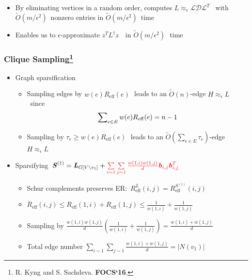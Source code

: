 \documentclass[12pt]{beamer}
\def\sizeof#1{\left|#1  \right|}
\def\eps{\epsilon}
\newcommand\ttau{\boldsymbol{\mathit{\tau}}}
\newcommand\er{R_{\mathrm{eff}}}
\newcommand\bb{\boldsymbol{\mathit{b}}}
\newcommand\zz{\boldsymbol{\mathit{z}}}
\newcommand\LL{\boldsymbol{\mathit{L}}}
\newcommand\LH{\boldsymbol{\mathit{H}}}
\renewcommand\SS{\boldsymbol{\mathit{S}}}
\newcommand{\calD}{\boldsymbol{\mathit{\mathcal{D}}}}
\newcommand{\matlow}{\boldsymbol{\mathit{{\mathcal{L}}}}}
\newcommand{\kh}[1]{\left(#1\right)}
\begin{document}
\begin{spacing}{1.3}
{\begin{itemize}
\begin{itemize}
				\item By eliminating vertices in a random order, computes \scriptsize$\LL\approx_\eps \matlow\calD\matlow^T$  
					\footnotesize\ with \scriptsize$\widetilde{O}(m/\eps^2)$\footnotesize\ nonzero entries in \scriptsize$\widetilde{O}(m/\eps^2)$\footnotesize\ time
				\item Enables us to \scriptsize$\eps$\footnotesize -approximate \scriptsize$\zz^T \LL^\dag \zz$\ \footnotesize\ 
					in \scriptsize$\widetilde{O}(m/\eps^2)$\,\footnotesize\ time
			\end{itemize}
	\end{itemize}
}


{
	\frametitle{Clique Sampling\footnote[frame]{\label{KS16}R. Kyng and S. Sachdeva. \textbf{FOCS`16}.}}
	\vspace{5pt}
	\begin{itemize}
		\small
		\item Graph sparsification
			\begin{itemize}
				\item \footnotesize Sampling edges by \scriptsize$w(e)\er(e)$\footnotesize\,\ leads to an
					\scriptsize$\widetilde{O}(n)$\footnotesize-edge \scriptsize$\LH \approx_\eps \LL$\footnotesize\,\ since
					\scriptsize\vspace{-8pt}
					\[
						\vspace{-8pt}
						\sum\nolimits_{e\in E} w(e)\er(e) = n - 1
					\]
					\footnotesize
				\item Sampling by \scriptsize$\ttau_e \geq w(e)\er(e)$\footnotesize\,\ leads to an
					\scriptsize$\widetilde{O}(\sum\nolimits_{e\in E}\ttau_e)$\footnotesize-edge \scriptsize$\LH \approx_\eps \LL$\footnotesize
			\end{itemize}
		\item Sparsifying \,\footnotesize$\SS^{(1)} = \LL_{G[V\setminus v_1]} + {\color{red} \sum\limits_{i\sim 1}\sum\limits_{j\sim 1} \frac{w(1,i)w(1,j)}{d}\bb_{i,j}\bb_{i,j}^T}$\small
		\begin{itemize}
			\item \footnotesize  Schur complements preserves ER: \,\scriptsize$\er^{\LL}(i,j) = \er^{\SS^{(1)}}(i,j)$\footnotesize
			\vspace{5pt}
			\item \scriptsize$\er(i,j) \leq \er(1,i) + \er(1,j)\leq \frac{1}{w(1,i)} + \frac{1}{w(1,j)}$\footnotesize
			\vspace{5pt}
			\item Sampling by \scriptsize$\frac{w(1,i)w(1,j)}{d} \kh{\frac{1}{w(1,i)} + \frac{1}{w(1,j)}} =
				\frac{w(1,i) + w(1,j)}{d}$\footnotesize
			\vspace{5pt}
			\item Total edge number \scriptsize$\sum\limits_{i\sim 1}\sum\limits_{j\sim 1} \frac{w(1,i) + w(1,j)}{d}
				= \sizeof{N(v_1)}$
		\end{itemize}
	\end{itemize}
}


\end{spacing}
\end{document}
